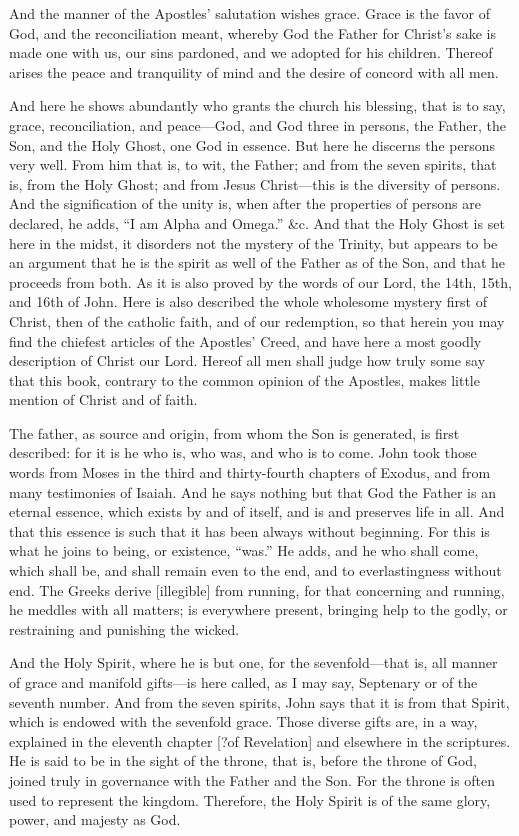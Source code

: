 And the manner of the Apostles’ salutation wishes grace. Grace is the favor of God, and the reconciliation meant, whereby God the Father for Christ’s sake is made one with us, our sins pardoned, and we adopted for his children. Thereof arises the peace and tranquility of mind and the desire of concord with all men.

And here he shows abundantly who grants the church his blessing, that is to say, grace, reconciliation, and peace—God, and God three in persons, the Father, the Son, and the Holy Ghost, one God in essence. But here he discerns the persons very well. From him that is, to wit, the Father; and from the seven spirits, that is, from the Holy Ghost; and from Jesus Christ—this is the diversity of persons. And the signification of the unity is, when after the properties of persons are declared, he adds, “I am Alpha and Omega.” \&c. And that the Holy Ghost is set here in the midst, it disorders not the mystery of the Trinity, but appears to be an argument that he is the spirit as well of the Father as of the Son, and that he proceeds from both. As it is also proved by the words of our Lord, the 14th, 15th, and 16th of John. Here is also described the whole wholesome mystery first of Christ, then of the catholic faith, and of our redemption, so that herein you may find the chiefest articles of the Apostles' Creed, and have here a most goodly description of Christ our Lord. Hereof all men shall judge how truly some say that this book, contrary to the common opinion of the Apostles, makes little mention of Christ and of faith.

The father, as source and origin, from whom the Son is generated, is first described: for it is he who is, who was, and who is to come. John took those words from Moses in the third and thirty-fourth chapters of Exodus, and from many testimonies of Isaiah. And he says nothing but that God the Father is an eternal essence, which exists by and of itself, and is and preserves life in all. And that this essence is such that it has been always without beginning. For this is what he joins to being, or existence, “was.” He adds, and he who shall come, which shall be, and shall remain even to the end, and to everlastingness without end. The Greeks derive [illegible] from running, for that concerning and running, he meddles with all matters; is everywhere present, bringing help to the godly, or restraining and punishing the wicked.

And the Holy Spirit, where he is but one, for the sevenfold—that is, all manner of grace and manifold gifts—is here called, as I may say, Septenary or of the seventh number. And from the seven spirits, John says that it is from that Spirit, which is endowed with the sevenfold grace. Those diverse gifts are, in a way, explained in the eleventh chapter [?of Revelation] and elsewhere in the scriptures. He is said to be in the sight of the throne, that is, before the throne of God, joined truly in governance with the Father and the Son. For the throne is often used to represent the kingdom. Therefore, the Holy Spirit is of the same glory, power, and majesty as God.


